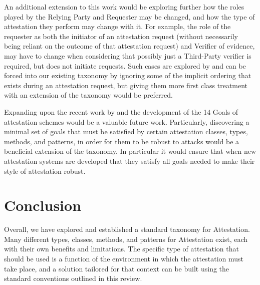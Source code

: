\documentclass[acmsmall]{acmart}
\theoremstyle{definition}
\begin{document}
An additional extension to this work would be exploring further how the
roles played by the Relying Party and Requester may be changed, and how
the type of attestation they perform may change with it.
For example, the role of the requester as both the initiator of an
attestation request (without necessarily being reliant on the outcome
of that attestation request) and Verifier of evidence, may have to change when considering that
possibly just a Third-Party verifier is required, but does not initiate
requests. Such cases are explored by \citet{helble2021flexible,Brickell:04:Direct-anonymou}
and can be forced into our existing taxonomy by
ignoring some of the implicit ordering that exists during an attestation request, but giving them more first class
treatment with an extension of the taxonomy would be
preferred.

Expanding upon the recent work by \citet{Usman:2023:Attestation-Assurance-Arguments} and
the development of the 14 Goals of attestation schemes would be a valuable future work.
Particularly, discovering a minimal set of goals that must be satisfied by certain attestation
classes, types, methods, and patterns, in order for them to be robust to attacks
would be a beneficial extension of the taxonomy.
In particular it would ensure that when new attestation systems are developed
that they satisfy all goals needed to make their style of attestation robust.

\section{Conclusion}
\label{sec:Conclusion}

Overall, we have explored and established a standard taxonomy for Attestation.
Many different types, classes, methods, and patterns for Attestation exist, 
each with their own benefits and limitations.
The specific type of attestation that should be used is a function of the 
environment in which the attestation must take place, and a solution 
tailored for that context can be built using the standard conventions
outlined in this review.



%
% 
%
\newpage
%

%


%
\end{document}

